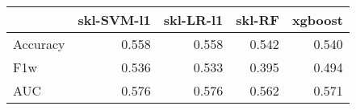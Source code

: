 \begin{tabular}{lrrrr}
\toprule
{} &  skl-SVM-l1 &  skl-LR-l1 &  skl-RF &  xgboost \\
\midrule
Accuracy &       0.558 &      0.558 &   0.542 &    0.540 \\
F1w      &       0.536 &      0.533 &   0.395 &    0.494 \\
AUC      &       0.576 &      0.576 &   0.562 &    0.571 \\
\bottomrule
\end{tabular}
